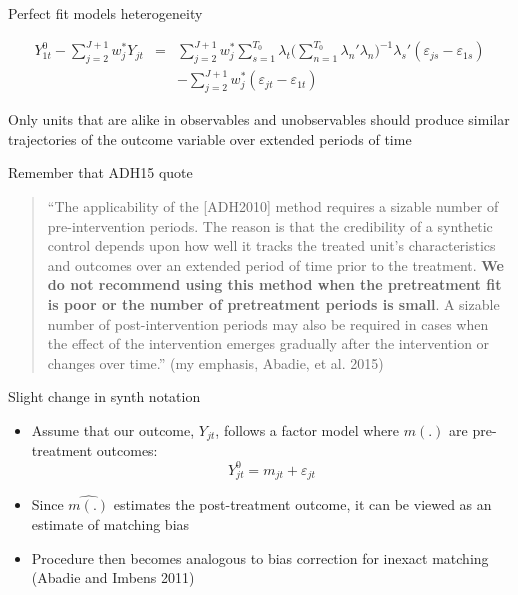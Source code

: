 \documentclass{beamer}
\begin{document}
\begin{frame}{Perfect fit models heterogeneity}


\begin{eqnarray*}
Y^0_{1t} - \sum^{J+1}_{j=2}w^*_jY_{jt} &=& \sum_{j=2}^{J+1} w_j^* \sum_{s=1}^{T_0} \lambda_t \bigg ( \sum_{n=1}^{T_0} \lambda_n'\lambda_n \bigg )
^{-1} \lambda_s'(\varepsilon_{js} - \varepsilon_{1s} ) \\
&& - \sum_{j=2}^{J+1} w_j^* (\varepsilon_{jt} - \varepsilon_{1t})
\end{eqnarray*}

Only units that are alike in observables and unobservables should produce similar trajectories of the outcome variable over extended periods of time


\end{frame}


\begin{frame}{Remember that ADH15 quote}

\begin{quote}
``The applicability of the [ADH2010] method requires a sizable number of pre-intervention periods. The reason is that the credibility of a synthetic control depends upon how well it tracks the treated unit’s characteristics and outcomes over an extended period of time prior to the treatment. \textbf{We do not recommend using this method when the pretreatment fit is poor or the number of pretreatment periods is small}. A sizable number of post-intervention periods may also be required in cases when the effect of the intervention emerges gradually after the intervention or changes over time.'' (my emphasis, Abadie, et al. 2015)
\end{quote}

\end{frame}

\begin{frame}{Slight change in synth notation}

\begin{itemize}
\item Assume that our outcome, $Y_{jt}$, follows a factor model where $m(.)$ are pre-treatment outcomes: $$ Y_{jt}^0 = m_{jt} + \varepsilon_{jt}$$
\item Since $\widehat{m(.)}$ estimates the post-treatment outcome, it can be viewed as an estimate of matching bias
\item Procedure then becomes analogous to bias correction for inexact matching (Abadie and Imbens 2011)
\end{itemize}

\end{frame}
\end{document}
